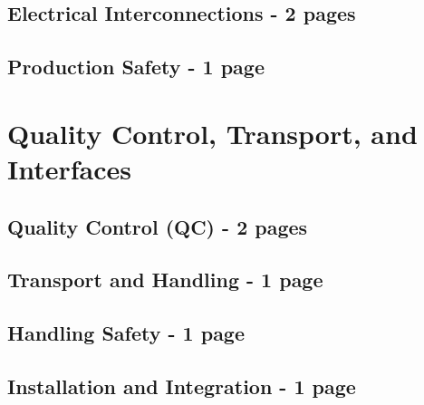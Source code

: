 \subsection{Electrical Interconnections - 2 pages}
\label{sec:fdsp-hv-prod-interconnect}
\subsection{Production Safety - 1 page}
\label{sec:fdsp-hv-prod-safety}
\clearpage
\section{Quality Control, Transport, and Interfaces}
\label{sec:fdsp-hv-transport}

\subsection{Quality Control (QC) - 2 pages}
\label{sec:fdsp-hv-transport-QC}
\subsection{Transport and Handling - 1 page}
\label{sec:fdsp-hv-transport-transport}

\subsection{Handling Safety -  1 page}
\label{sec:fdsp-hv-transport-safety}


\subsection{Installation and Integration -  1 page}
\label{sec:fdsp-hv-transport-install}

